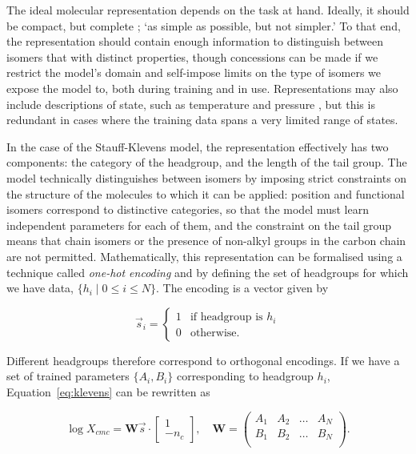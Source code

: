 The ideal molecular representation depends on the task at hand. Ideally, it
should be compact, but complete
\cite{faberCrystalStructureRepresentations2015,himanenDScribeLibraryDescriptors2020};
`as simple as possible, but not simpler.' To that end, the representation should
contain enough information to distinguish between isomers that with distinct
properties, though concessions can be made if we restrict the model's domain and
self-impose limits on the type of isomers we expose the model to, both during
training and in use. Representations may also include descriptions of state,
such as temperature and pressure \cite{chenGraphNetworksUniversal2019}, but this
is redundant in cases where the training data spans a very limited range of
states.

In the case of the Stauff-Klevens model, the representation effectively has two
components: the category of the headgroup, and the length of the tail group. The
model technically distinguishes between isomers by imposing strict constraints
on the structure of the molecules to which it can be applied: position and
functional isomers correspond to distinctive categories, so that the model must
learn independent parameters for each of them, and the constraint on the tail
group means that chain isomers or the presence of non-alkyl groups in the carbon
chain are not permitted. Mathematically, this representation can be formalised using
a technique called \emph{one-hot encoding} and by defining the set of headgroups for which
we have data, $\{h_i \mid 0 \leq i \leq N\}$. The encoding is a vector given by

\begin{equation}
    \label{eq:one-hot}
    \vec{s}_i = \begin{cases}
        1 & \text{if headgroup is } h_i \\
        0 & \text{otherwise.}
    \end{cases}
\end{equation}

Different headgroups therefore correspond to orthogonal encodings. If we have a
set of trained parameters $\{A_i, B_i\}$ corresponding to headgroup $h_i$,
Equation~\ref{eq:klevens} can be rewritten as

\begin{equation}
    \log X_{cmc} = \mathbf{W}\vec{s} \cdot \begin{bmatrix}
        1 \\ -n_c
    \end{bmatrix},\quad \mathbf{W} = \begin{pmatrix}
        A_1 & A_2 & \dots & A_N \\
        B_1 & B_2 & \dots & B_N \\
    \end{pmatrix}.
\end{equation}


